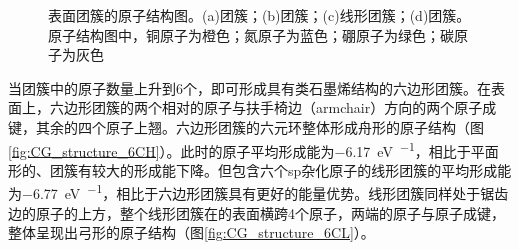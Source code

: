 \begin{figure}[htb]
{            \label{fig:CG_structure_5C}
        }
        \caption{表面团簇的原子结构图。(a)团簇；(b)团簇；(c)线形团簇；(d)团簇。原子结构图中，铜原子为橙色；氮原子为蓝色；硼原子为绿色；碳原子为灰色}
        \label{fig:CG_structure_3-5C}
    \end{figure}

    当团簇中的原子数量上升到6个，即可形成具有类石墨烯结构的六边形团簇。在表面上，六边形团簇的两个相对的原子与扶手椅边（armchair）方向的两个原子成键，其余的四个原子上翘。六边形团簇的六元环整体形成舟形的原子结构（图\ref{fig:CG_structure_6CH}）。此时的原子平均形成能为\SI{-6.17}{\electronvolt\per\atom}，相比于平面形的、团簇有较大的形成能下降。但包含六个sp杂化原子的线形团簇的平均形成能为\SI{-6.77}{\electronvolt\per\atom}，相比于六边形团簇具有更好的能量优势。线形团簇同样处于锯齿边的原子的上方，整个线形团簇在的表面横跨4个原子，两端的原子与原子成键，整体呈现出弓形的原子结构（图\ref{fig:CG_structure_6CL}）。

